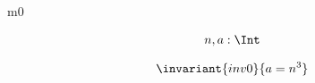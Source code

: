 \documentclass[12pt]{amsart}
\title{}
\author{}
\date{} %
\begin{document}
\maketitle
\tableofcontents


\begin{machine}{m0}

	\begin{align*}
\variable{		n,a : \Int}
	\end{align*}

\begin{align*}
\invariant{inv0}
{	a = n^3	}
\end{align*}
%



\end{machine}
\end{document}
